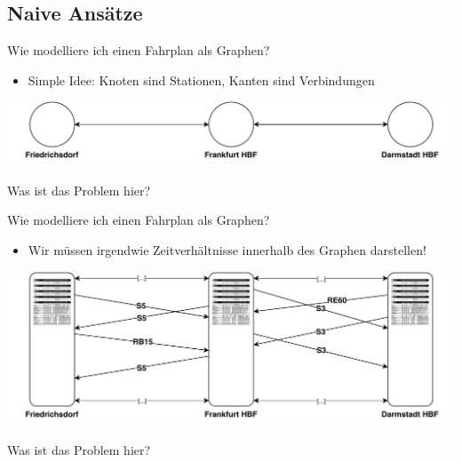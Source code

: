 \subsection{Naive Ansätze}
\begin{frame}{Wie modelliere ich einen Fahrplan als Graphen?}
	\begin{itemize}
		\item Simple Idee: Knoten sind Stationen, Kanten sind Verbindungen 
	\end{itemize}
	
	\vspace{3em}
	\includegraphics[width=\linewidth]{images/simple-approach.pdf}
	\vspace{3em}
	\begin{block}{}
		Was ist das Problem hier?
	\end{block}
\end{frame}

\begin{frame}{Wie modelliere ich einen Fahrplan als Graphen?}
	\begin{itemize}
		\item Wir müssen irgendwie Zeitverhältnisse innerhalb des Graphen darstellen!
	\end{itemize}
	
	\begin{center}
		\includegraphics[width=\linewidth]{images/simple-approach-timed.pdf}
	\end{center}

	\begin{block}{}
		Was ist das Problem hier?
	\end{block}
\end{frame}

%	
%

